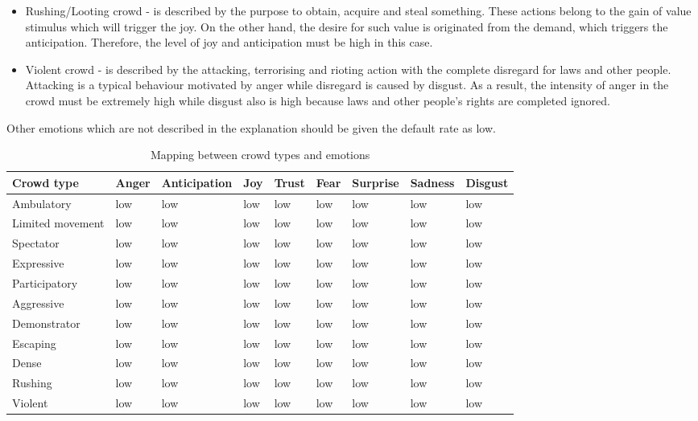 \begin{itemize}
\item Rushing/Looting crowd - is described by the purpose to obtain, acquire and steal something. These actions belong to the gain of value stimulus which will trigger the joy. On the other hand, the desire for such value is originated from the demand, which triggers the anticipation. Therefore, the level of joy and anticipation must be high in this case. 
\item Violent crowd - is described by the attacking, terrorising and rioting action with the complete disregard for laws and other people. Attacking is a typical behaviour motivated by anger while disregard is caused by disgust. As a result, the intensity of anger in the crowd must be extremely high while disgust also is high because laws and other people's rights are completed ignored.
\end{itemize}

Other emotions which are not described in the explanation should be given the default rate as low.

\begin{table}
\caption{Mapping between crowd types and emotions}
\label{table:mappingEmotionCrowdType}
\begin{tabular}{|p{2cm}|p{1.2cm}|p{1.2cm}|p{1.2cm}|p{1.2cm}|p{1.2cm}|p{1.2cm}|p{1.2cm}|p{1.2cm}|}
\hline
\textbf{Crowd type} & \textbf{Anger} & \textbf{Anticipation} & \textbf{Joy} & \textbf{Trust} & \textbf{Fear} & \textbf{Surprise} & \textbf{Sadness} & \textbf{Disgust} \\
\hline
Ambulatory & low & low & low & low & low & low & low & low \\
\hline
Limited movement & low & low & low & low & low & low & low & low \\
\hline
Spectator			& low 				& low				& low		& low 			& low 			& low			& low 				& low 		\\
\hline
Expressive			& low 				& low				& low		& low 			& low 			& low			& low 				& low 		\\
\hline
Participatory		& low 				& low				& low		& low			& low 			& low 				& low 				& low 		\\
\hline
Aggressive			& low				& low 				& low 			& low 				& low 			& low 				& low 				& low	\\
\hline
Demonstrator		& low				& low 					& low 			& low 				& low 			& low 				& low			& low	\\
\hline
Escaping			& low 				& low 					& low 			& low 				& low		& low			& low 				& low 		\\
\hline
Dense				& low				& low 					& low 			& low 				& low		& low			& low 				& low	\\
\hline
Rushing				& low				& low 					& low 			& low 				& low 			& low 				& low 				& low	\\
\hline
Violent				& low				& low 					& low 			& low 				& low 			& low 				& low 				& low	\\
\hline
\end{tabular}
\end{table}

